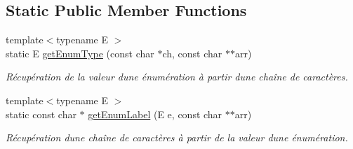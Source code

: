 \subsection*{Static Public Member Functions}
\begin{DoxyCompactItemize}
\item 
{\footnotesize template$<$typename E $>$ }\\static E \hyperlink{class_call_a46a8f56e18b25a36d951c3d59ec3211a}{get\+Enum\+Type} (const char $\ast$ch, const char $\ast$$\ast$arr)
\begin{DoxyCompactList}\small\item\em Récupération de la valeur d\textquotesingle{}une énumération à partir d\textquotesingle{}une chaîne de caractères. \end{DoxyCompactList}\item 
{\footnotesize template$<$typename E $>$ }\\static const char $\ast$ \hyperlink{class_call_a1df0e032b2cb618b6b92e8f86c3704a9}{get\+Enum\+Label} (E e, const char $\ast$$\ast$arr)
\begin{DoxyCompactList}\small\item\em Récupération d\textquotesingle{}une chaîne de caractères à partir de la valeur d\textquotesingle{}une énumération. \end{DoxyCompactList}\end{DoxyCompactItemize}
